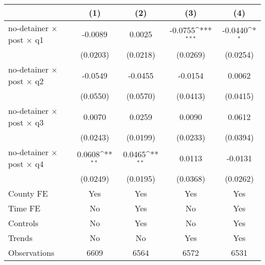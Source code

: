 {
\def\sym#1{\ifmmode^{#1}\else\(^{#1}\)\fi}
\begin{tabular*}{0.7\textwidth}{@{\hskip\tabcolsep\extracolsep\fill}l*{4}{c}}
\hline\hline
                    &\multicolumn{1}{c}{(1)}         &\multicolumn{1}{c}{(2)}         &\multicolumn{1}{c}{(3)}         &\multicolumn{1}{c}{(4)}         \\
\hline
no-detainer $\times$ post $\times$ q1&     -0.0089         &      0.0025         &     -0.0755\sym{***}&     -0.0440\sym{*}  \\
                    &    (0.0203)         &    (0.0218)         &    (0.0269)         &    (0.0254)         \\
[1em]
no-detainer $\times$ post $\times$ q2&     -0.0549         &     -0.0455         &     -0.0154         &      0.0062         \\
                    &    (0.0550)         &    (0.0570)         &    (0.0413)         &    (0.0415)         \\
[1em]
no-detainer $\times$ post $\times$ q3&      0.0070         &      0.0259         &      0.0090         &      0.0612         \\
                    &    (0.0243)         &    (0.0199)         &    (0.0233)         &    (0.0394)         \\
[1em]
no-detainer $\times$ post $\times$ q4&      0.0608\sym{**} &      0.0465\sym{**} &      0.0113         &     -0.0131         \\
                    &    (0.0249)         &    (0.0195)         &    (0.0368)         &    (0.0262)         \\
[1em]
County FE           &         Yes         &         Yes         &         Yes         &         Yes         \\
[1em]
Time FE             &          No         &         Yes         &          No         &         Yes         \\
[1em]
Controls            &          No         &         Yes         &          No         &         Yes         \\
[1em]
Trends              &          No         &          No         &         Yes         &         Yes         \\
\hline
Observations        &        6609         &        6564         &        6572         &        6531         \\
\hline\hline
\end{tabular*}
}
